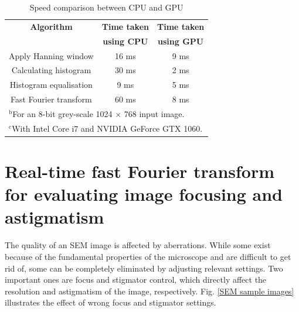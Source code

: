 \documentclass[12pt, conference]{IEEEtran}
\begin{document}
\begin{table}[htbp]
    \caption{Speed comparison between CPU and GPU}
    \begin{center}
    \begin{tabular}{|c|c|c|}
    \hline
    \textbf{Algorithm} & \textbf{Time taken} & \textbf{Time taken} \\
    & \textbf{using CPU} & \textbf{using GPU} \\
    \hline
    Apply Hanning window & 16 ms & 9 ms \\
    \hline
    Calculating histogram & 30 ms & 2 ms \\
    \hline
    Histogram equalisation & 9 ms & 5 ms \\
    \hline
    Fast Fourier transform & 60 ms & 8 ms \\
    \hline
    \multicolumn{3}{l}{$^{\mathrm{b}}$For an 8-bit grey-scale 1024 $\times$ 768 input image.} \\
    \multicolumn{3}{l}{$^{\mathrm{c}}$With Intel Core i7 and NVIDIA GeForce GTX 1060.}
    \end{tabular}
    \label{Software speed comparison}
    \end{center}
\end{table}

\section{Real-time fast Fourier transform for evaluating image focusing and astigmatism}
\label{Section FFT}
The quality of an SEM image is affected by aberrations. While some exist because of the fundamental properties of the microscope and are difficult to get rid of, some can be completely eliminated by adjusting relevant settings. Two important ones are focus and stigmator control, which directly affect the resolution and astigmatism of the image, respectively. Fig. \ref{SEM sample images} illustrates the effect of wrong focus and stigmator settings.
\end{document}
